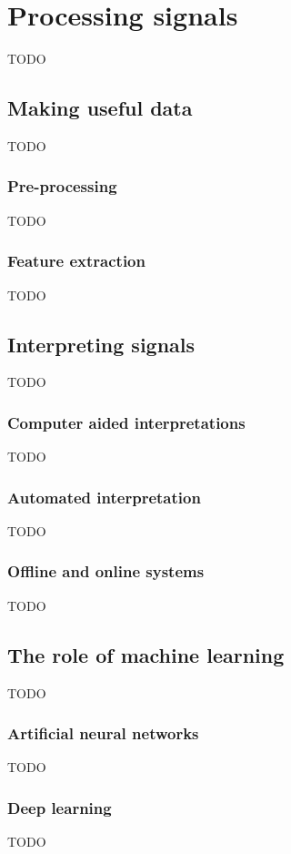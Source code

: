 
\chapter{Processing signals}
\label{ch:processing_signals}
TODO

\section{Making useful data}
\label{sec:processing_signals_useful_data}
TODO


\subsection{Pre-processing}
\label{subsec:processing_signals_useful_data_preproc}
TODO

\subsection{Feature extraction}
\label{subsec:processing_signals_useful_data_feature}
TODO



\section{Interpreting signals}
\label{sec:processing_signals_interpreting}
TODO


\subsection{Computer aided interpretations}
\label{subsec:processing_signals_interpreting_pc_aided}
TODO

\subsection{Automated interpretation}
\label{subsec:processing_signals_interpreting_automated}
TODO

\subsection{Offline and online systems}
\label{subsec:processing_signals_interpreting_offline_online}
TODO

\section{The role of machine learning}
\label{sec:processing_signals_interpreting_ml}
TODO

\subsection{Artificial neural networks}
\label{subsec:processing_signals_interpreting_ml_ann}
TODO

\subsection{Deep learning}
\label{subsec:processing_signals_interpreting_ml_deep_learning}
TODO